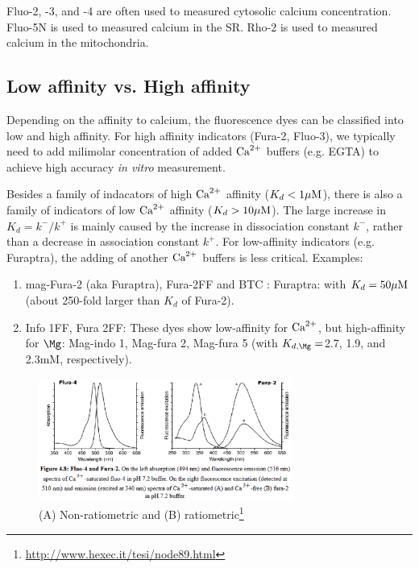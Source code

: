 \begin{framed}
Fluo-2, -3, and -4 are often used to measured cytosolic calcium
concentration. Fluo-5N is used to measured calcium in the SR. Rho-2 is used to
measured calcium in the mitochondria.
\end{framed}

\subsection{Low affinity vs. High affinity}

Depending on the affinity to calcium, the fluorescence dyes can be classified
into low and high affinity. For high affinity indicators (Fura-2, Fluo-3), we
typically need to add milimolar concentration of added ${\text{Ca}^{2+}}$ buffers (e.g. EGTA)
to achieve high accuracy {\it in vitro} measurement.

Besides a family of indacators of high ${\text{Ca}^{2+}}$ affinity ($K_d < 1{\mu\text{M}}$), there is
also a family of indicators of low ${\text{Ca}^{2+}}$ affinity ($K_d > 10{\mu\text{M}}$). The large
increase in $K_d=k^-/k^+$ is mainly caused by the increase in dissociation
constant $k^-$, rather than a decrease in association constant $k^+$. For
low-affinity indicators (e.g. Furaptra), the adding of another ${\text{Ca}^{2+}}$ buffers is
less critical.
Examples:
\begin{enumerate}
  \item mag-Fura-2 (aka Furaptra), Fura-2FF and BTC \citep{hyrc2000}: Furaptra:
  with $K_d = 50{\mu\text{M}}$ (about 250-fold larger than $K_d$ of  Fura-2).

\item Info 1FF, Fura 2FF: These dyes show low-affinity for ${\text{Ca}^{2+}}$, but
high-affinity for $\Mg$: Mag-indo 1, Mag-fura 2, Mag-fura 5 (with $K_{d,\Mg} =
$2.7, 1.9, and 2.3mM, respectively)\citep{takahashi1999}.

\end{enumerate}


\begin{figure}[hbt]
  \centerline{\includegraphics[height=4cm,
    angle=0]{./images/ratiometric_nonratiometric.eps}}
\caption{(A) Non-ratiometric and (B)
ratiometric\footnote{\url{http://www.hexec.it/tesi/node89.html}}}
\label{fig:ratiometric_nonratiometric}
\end{figure}

